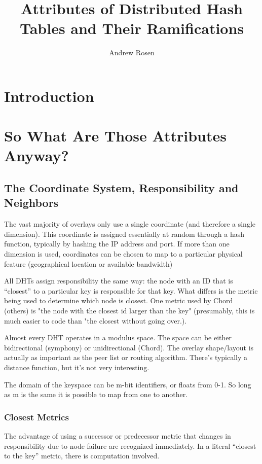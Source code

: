 \documentclass[10pt,letterpaper]{report}
\author{Andrew Rosen}
\title{Attributes of Distributed Hash Tables and Their Ramifications}
\begin{document}
\maketitle


\chapter{Introduction}


\chapter{So What Are Those Attributes Anyway?}

\section{The Coordinate System, Responsibility and Neighbors}

The vast majority of overlays only use a single coordinate (and therefore a single dimension).  This coordinate is assigned essentially at random through a hash function, typically by hashing the IP address and port.  If more than one dimension is used, coordinates can be chosen to map to a particular physical feature (geographical location  or available bandwidth)

All DHTs assign responsibility the same way:  the node with an ID that is ``closest'' to a particular key is responsible for that key.  What differs is the metric being used to determine which node is closest.  One metric used by Chord (others) is "the node with the closest id larger than the key" (presumably, this is much easier to code than "the closest without going over.).

Almost every DHT operates in a modulus space.  The space can be either bidirectional (symphony) or unidirectional (Chord).
The overlay shape/layout is actually as important as the peer list or  routing algorithm.
There's typically a distance function, but it's not very interesting.


The domain of the keyspace can be m-bit identifiers, or floats from 0-1.  So long as m is the same it is possible to map from one to another.
\subsection{Closest Metrics}

The advantage of using a successor or predecessor metric that changes in responsibility due to node failure are recognized immediately.  In a literal ``closest to the key'' metric, there is computation involved.
\end{document}

